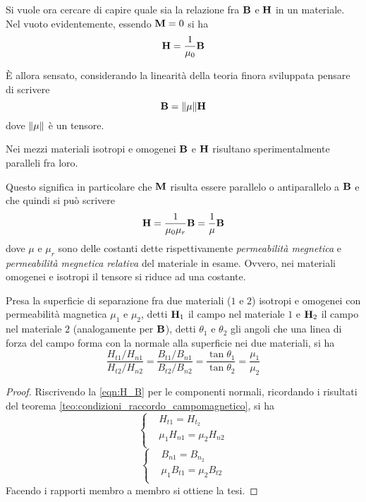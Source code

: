 Si vuole ora cercare di capire quale sia la relazione fra $\vb{B}$ e $\vb{H}$ in un materiale.
Nel vuoto evidentemente, essendo $\vb{M}=0$ si ha
\[
    \vb{H}=\frac{1}{\mu_0}\vb{B}
\]

È allora sensato, considerando la linearità della teoria finora sviluppata pensare di scrivere
\[
    \vb{B}=\norm{\mu}\vb{H}
\]
dove $\norm{\mu}$ è un tensore.
\begin{obses}
    Nei mezzi materiali isotropi e omogenei $\vb{B}$ e $\vb{H}$ risultano sperimentalmente paralleli fra loro.
\end{obses}
Questo significa in particolare che $\vb{M}$ risulta essere parallelo o antiparallelo a $\vb{B}$ e che quindi
si può scrivere
\begin{equation}
    \vb{H}=\frac{1}{\mu_0\mu_r}\vb{B}=\frac{1}{\mu}\vb{B}
    \label{eqn:H_B}
\end{equation}
dove $\mu$ e $\mu_r$ sono delle costanti dette rispettivamente \textit{permeabilità megnetica} e
\textit{permeabilità megnetica relativa} del materiale in esame. Ovvero, nei materiali omogenei e isotropi
il tensore si riduce ad una costante.
\begin{thm}
    Presa la superficie di separazione fra due materiali ($1$ e $2$) isotropi e omogenei
    con permeabilità magnetica $\mu_1$ e $\mu_2$, detti $\vb{H}_1$ il campo nel materiale $1$ e
    $\vb{H}_2$ il campo nel materiale $2$ (analogamente per $\vb{B}$), detti $\theta_1$ e $\theta_2$ gli angoli che una
    linea di forza del campo forma con la normale alla superficie nei due materiali, si ha
    \[
        \frac{H_{t1}/{H_{n1}}}{H_{t2}/{H_{n2}}}=\frac{B_{t1}/{B_{n1}}}{B_{t2}/{B_{n2}}}=\frac{\tan{\theta_1}}{\tan{\theta_2}}=\frac{\mu_1}{\mu_2}
    \]
\end{thm}
\begin{proof}
    Riscrivendo la \eqref{eqn:H_B} per le componenti normali, ricordando i risultati del
    teorema \ref{teo:condizioni_raccordo_campomagnetico}, si ha
    \[
        \begin{cases}
            & H_{t1}=H_{t_2} \\
            & \mu_1 H_{n1}=\mu_2 H_{n2} \\
        \end{cases}
    \]
    \[
        \begin{cases}
            & B_{n1}=B_{n_2} \\
            & \mu_1 B_{t1}=\mu_2 B_{t2} \\
        \end{cases}
    \]
    Facendo i rapporti membro a membro si ottiene la tesi.
\end{proof}

